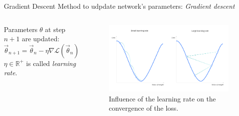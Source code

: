 \begin{frame}{Gradient Descent}
    Method to udpdate network's parameters: \emph{Gradient descent}~\cite{cauchymethode}
    \begin{columns}
        \column{\moit} Parameters $\theta$  at step $n+1$ are updated:
            \begin{equation*}
                    \label{eq:gradient-descent}
                    \Vec{\theta}_{n+1} = \Vec{\theta}_n - \eta \nabla \mathcal{L}(\Vec{\theta}_n)
            \end{equation*}
            $\eta \in \mathbb{R}^+$ is called \emph{learning rate}.
        \column{\moit} 
        \begin{figure}
            \centering
            \includegraphics[width=\textwidth]{imgs/desc-grad.png}
            \caption{Influence of the learning rate on the convergence of the loss.}
        \end{figure}
    \end{columns}
\end{frame}






        
        
